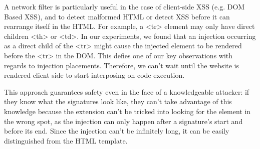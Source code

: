 A network filter is particularly useful in the case of client-side XSS (e.g. DOM Based XSS), and to detect malformed HTML or detect XSS before it can rearrange itself in the HTML. For example, a <tr> element may only have direct children <th> or <td>. In our experiments, we found that an injection occurring as a direct child of the <tr> might cause the injected element to be rendered before the <tr> in the DOM. This defies one of our key observations with regards to injection placements. Therefore, we can't wait until the website is rendered client-side to start interposing on code execution.

This approach guarantees safety even in the face of a knowledgeable attacker: if they know what the signatures look like, they can't take advantage of this knowledge because the extension can't be tricked into looking for the element in the wrong spot, as the injection can only happen after a signature's start and before its end. Since the injection can't be infinitely long, it can be easily distinguished from the HTML template.

